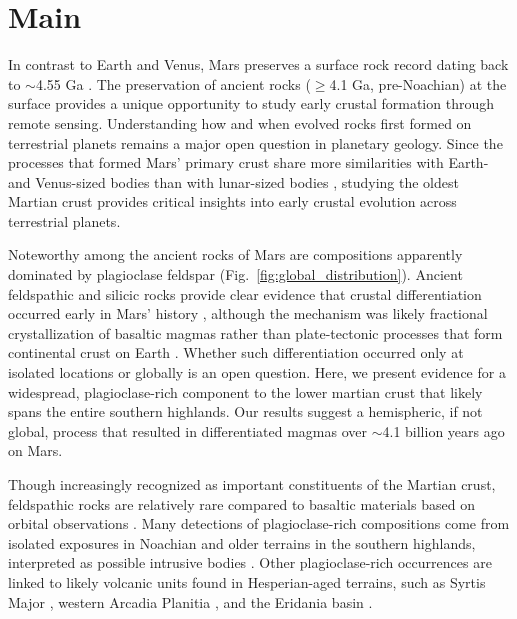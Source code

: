 \documentclass[12pt]{article}
\begin{document}
\section*{Main}

In contrast to Earth and Venus, Mars preserves a surface rock record dating back to $\sim$4.55 Ga \citep{Humayun2013, Kruijer2020}. The preservation of ancient rocks ($\geq$4.1 Ga, pre-Noachian) at the surface provides a unique opportunity to study early crustal formation through remote sensing. Understanding how and when evolved rocks first formed on terrestrial planets remains a major open question in planetary geology. Since the processes that formed Mars' primary crust share more similarities with Earth- and Venus-sized bodies than with lunar-sized bodies \citep{Elkins-Tanton2012}, studying the oldest Martian crust provides critical insights into early crustal evolution across terrestrial planets.

Noteworthy among the ancient rocks of Mars are compositions apparently dominated by plagioclase feldspar (Fig.~\ref{fig:global_distribution}). Ancient feldspathic and silicic rocks provide clear evidence that crustal differentiation occurred early in Mars' history \citep[e.g.,][]{Stolper2013, Sautter2015}, although the mechanism was likely fractional crystallization of basaltic magmas rather than plate-tectonic processes that form continental crust on Earth \citep{Udry2018}. Whether such differentiation occurred only at isolated locations or globally is an open question. Here, we present evidence for a widespread, plagioclase-rich component to the lower martian crust that likely spans the entire southern highlands. Our results suggest a hemispheric, if not global, process that resulted in differentiated magmas over $\sim$4.1 billion years ago on Mars.

Though increasingly recognized as important constituents of the Martian crust, feldspathic rocks are relatively rare compared to basaltic materials based on orbital observations \citep{McSween2009, McSween2015, McSween2023}. Many detections of plagioclase-rich compositions come from isolated exposures in Noachian and older terrains in the southern highlands, interpreted as possible intrusive bodies \citep{Quantin2012, Carter2013, Wray2013, Sautter2016, Payre2022}. Other plagioclase-rich occurrences are linked to likely volcanic units found in Hesperian-aged terrains, such as Syrtis Major \citep{Eggers2021}, western Arcadia Planitia \citep{Farrand2021, Rogers2022}, and the Eridania basin \citep{Michalski2023}.
\end{document}
